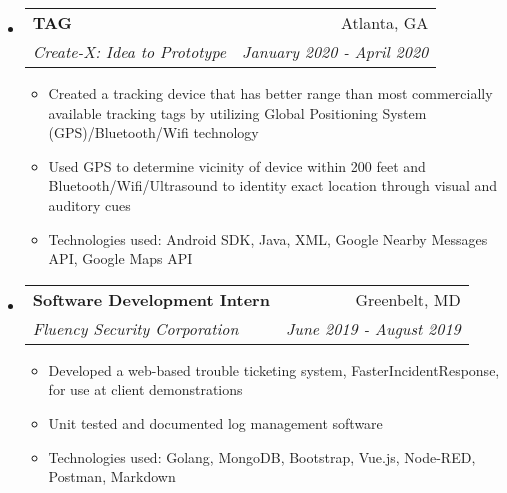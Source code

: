 \documentclass[letterpaper,10pt]{article}
\makeatletter
\newcommand{\resitem}[1]{\item #1 \vspace{-2pt}}
\newcommand{\ressubheading}[4]{
\begin{tabular*}{7.0in}{l@{\extracolsep{\fill}}r}
		\textbf{#1} & #2 \\
		\textit{#3} & \textit{#4} \\
\end{tabular*}\vspace{-6pt}}
\makeatother
\begin{document}
\begin{itemize}
\item
    \ressubheading{TAG}{Atlanta, GA}{Create-X: Idea to Prototype}{January 2020 - April 2020}
    \begin{itemize}
        \resitem{Created a tracking device that has better range than most commercially available tracking tags by utilizing Global Positioning System (GPS)/Bluetooth/Wifi technology}
        \resitem{Used GPS to determine vicinity of device within 200 feet and Bluetooth/Wifi/Ultrasound to identity exact location through visual and auditory cues}
        \resitem{Technologies used: Android SDK, Java, XML, Google Nearby Messages API, Google Maps API}
    \end{itemize}
\item
    \ressubheading{Software Development Intern}{Greenbelt, MD}{Fluency Security Corporation}{June 2019 - August 2019}
	\begin{itemize}
	    \resitem{Developed a web-based trouble ticketing system, FasterIncidentResponse, for use at client demonstrations}
		\resitem{Unit tested and documented log management software}
		\resitem{Technologies used: Golang, MongoDB, Bootstrap, Vue.js, Node-RED, Postman, Markdown}
	\end{itemize}
\end{itemize}

\pagebreak
\end{document}

